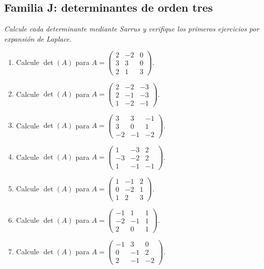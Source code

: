 \documentclass[12pt]{article}
\theoremstyle{remark}
\newcounter{contadorEjercicio}
\newenvironment{listaejercicios}{\begin{enumerate}[label=\textbf{E\arabic*.},leftmargin=2.4em,itemsep=0.52em]\setcounter{enumi}{\value{contadorEjercicio}}}{\setcounter{contadorEjercicio}{\value{enumi}}\end{enumerate}}
\begin{document}
\subsection{Familia J: determinantes de orden tres}\noindent\textit{Calcule cada determinante mediante Sarrus y verifique los primeros ejercicios por expansión de Laplace.}\par\medskip
\begin{listaejercicios}

\item Calcule $\det(A)$ para $A=\begin{pmatrix}2&-2&0\\3&3&0\\2&1&3\end{pmatrix}$.

\item Calcule $\det(A)$ para $A=\begin{pmatrix}2&-2&-3\\2&-1&-3\\1&-2&-1\end{pmatrix}$.

\item Calcule $\det(A)$ para $A=\begin{pmatrix}3&3&-1\\3&0&1\\-2&-1&-2\end{pmatrix}$.

\item Calcule $\det(A)$ para $A=\begin{pmatrix}1&-3&2\\-3&-2&2\\1&-1&-1\end{pmatrix}$.

\item Calcule $\det(A)$ para $A=\begin{pmatrix}1&-1&2\\0&-2&1\\1&2&3\end{pmatrix}$.

\item Calcule $\det(A)$ para $A=\begin{pmatrix}-1&1&1\\-2&-1&1\\2&0&1\end{pmatrix}$.

\item Calcule $\det(A)$ para $A=\begin{pmatrix}-1&3&0\\0&-1&2\\2&-1&-2\end{pmatrix}$.


\end{listaejercicios}
\end{document}
